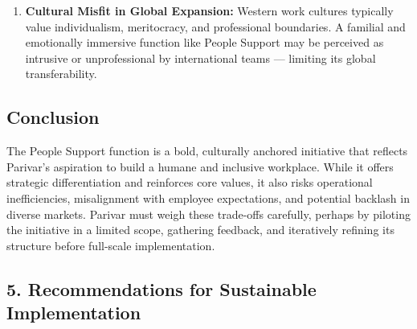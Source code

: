 \documentclass[10pt,a4paper]{book}
\begin{document}
\begin{enumerate}
    \item \textbf{Cultural Misfit in Global Expansion:} Western work cultures typically value individualism, meritocracy, and professional boundaries. A familial and emotionally immersive function like People Support may be perceived as intrusive or unprofessional by international teams — limiting its global transferability.

\end{enumerate}

\subsection*{Conclusion}

The People Support function is a bold, culturally anchored initiative that reflects Parivar’s aspiration to build a humane and inclusive workplace. While it offers strategic differentiation and reinforces core values, it also risks operational inefficiencies, misalignment with employee expectations, and potential backlash in diverse markets. Parivar must weigh these trade-offs carefully, perhaps by piloting the initiative in a limited scope, gathering feedback, and iteratively refining its structure before full-scale implementation.


\subsection*{5. Recommendations for Sustainable Implementation}
\end{document}
